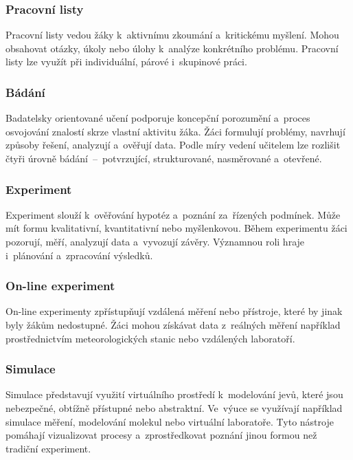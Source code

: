 \documentclass[male,czech,api_bc]{kitheses}
\begin{document}
\subsubsection{Pracovní listy}

Pracovní listy vedou žáky k~aktivnímu zkoumání a~kritickému myšlení. Mohou obsahovat otázky, úkoly nebo úlohy k~analýze konkrétního problému. Pracovní listy lze využít při individuální, párové i~skupinové práci.\cite{eduPracovniListy}

\subsubsection{Bádání}

Badatelsky orientované učení podporuje koncepční porozumění a~proces osvojování znalostí skrze vlastní aktivitu žáka. Žáci formulují problémy, navrhují způsoby řešení, analyzují a~ověřují data. Podle míry vedení učitelem lze rozlišit čtyři úrovně bádání~--~potvrzující, strukturované, nasměrované a~otevřené.\cite{eduBadani}

\subsubsection{Experiment}

Experiment slouží k~ověřování hypotéz a~poznání za~řízených podmínek. Může mít formu kvalitativní, kvantitativní nebo myšlenkovou. Během experimentu žáci pozorují, měří, analyzují data a~vyvozují závěry. Významnou roli hraje i~plánování a~zpracování výsledků.\cite{eduExperiment}

\subsubsection{On-line experiment}

On-line experimenty zpřístupňují vzdálená měření nebo přístroje, které by jinak byly žákům nedostupné. Žáci mohou získávat data z~reálných měření například prostřednictvím meteorologických stanic nebo vzdálených laboratoří.\cite{eduOnlineExperiment}

\newpage

\subsubsection{Simulace}

Simulace představují využití virtuálního prostředí k~modelování jevů, které jsou nebezpečné, obtížně přístupné nebo abstraktní. Ve~výuce se využívají například simulace měření, modelování molekul nebo virtuální laboratoře. Tyto nástroje pomáhají vizualizovat procesy a~zprostředkovat poznání jinou formou než tradiční experiment.\cite{eduSimulace}
\end{document}
